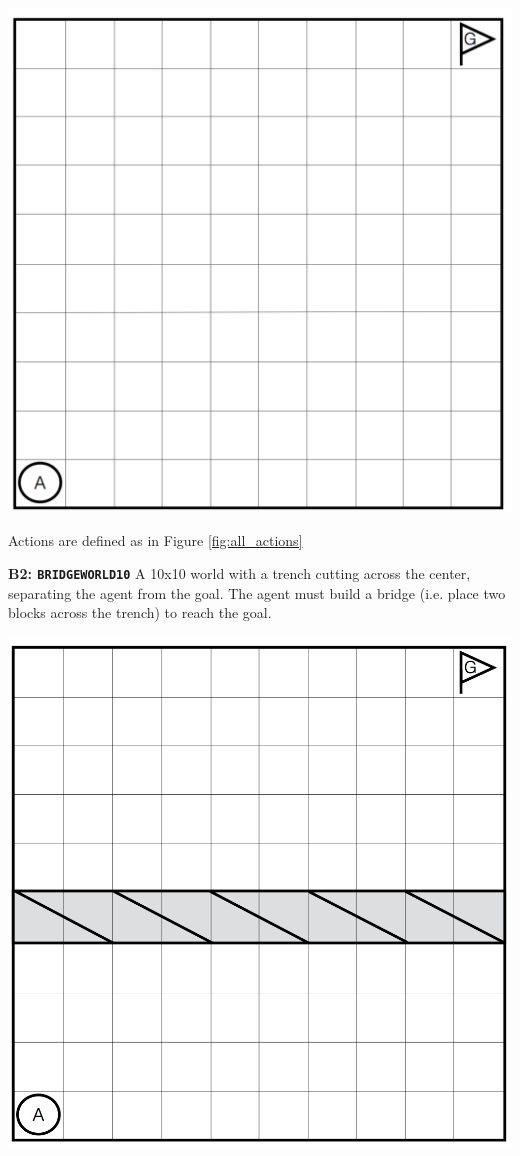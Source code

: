 \documentclass[]{article}
\begin{document}
\begin{center}
\includegraphics[scale=0.24]{figures/flatland.png}
\end{center}

Actions are defined as in Figure \ref{fig:all_actions}
	
{\bf B2: \texttt{BRIDGEWORLD10}} A 10x10 world with a trench cutting across the center, separating the agent from the goal. The agent must build a bridge (i.e. place two blocks across the trench) to reach the goal.

\begin{center}
\includegraphics[scale=0.28]{figures/bridgeworld10.png}
\end{center}
\end{document}
